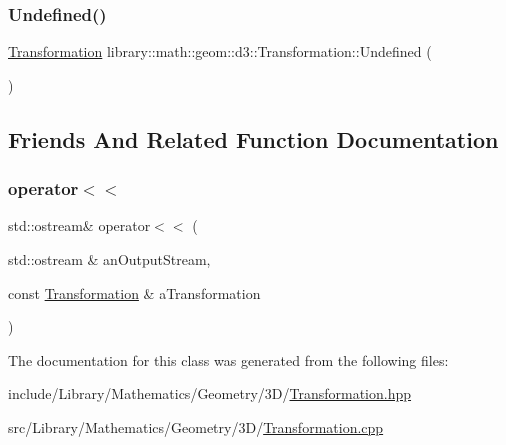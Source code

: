 \subsubsection{\texorpdfstring{Undefined()}{Undefined()}}
{\footnotesize\ttfamily \hyperlink{classlibrary_1_1math_1_1geom_1_1d3_1_1_transformation}{Transformation} library\+::math\+::geom\+::d3\+::\+Transformation\+::\+Undefined (\begin{DoxyParamCaption}{ }\end{DoxyParamCaption})\hspace{0.3cm}{\ttfamily [static]}}



\subsection{Friends And Related Function Documentation}
\mbox{\label{classlibrary_1_1math_1_1geom_1_1d3_1_1_transformation_afb2829e106dc4aeab1c706d1eaa357e8}} 
\subsubsection{\texorpdfstring{operator$<$$<$}{operator<<}}
{\footnotesize\ttfamily std\+::ostream\& operator$<$$<$ (\begin{DoxyParamCaption}\item[{std\+::ostream \&}]{an\+Output\+Stream,  }\item[{const \hyperlink{classlibrary_1_1math_1_1geom_1_1d3_1_1_transformation}{Transformation} \&}]{a\+Transformation }\end{DoxyParamCaption})\hspace{0.3cm}{\ttfamily [friend]}}



The documentation for this class was generated from the following files\+:\begin{DoxyCompactItemize}
\item 
include/\+Library/\+Mathematics/\+Geometry/3\+D/\hyperlink{3_d_2_transformation_8hpp}{Transformation.\+hpp}\item 
src/\+Library/\+Mathematics/\+Geometry/3\+D/\hyperlink{3_d_2_transformation_8cpp}{Transformation.\+cpp}\end{DoxyCompactItemize}
